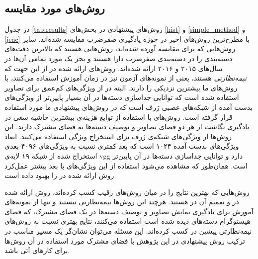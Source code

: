\subsection{روش‌های مورد مقایسه}\label{exp:other_methods}
 در جدول 
  \ref{tab:results}
 روش‌های پیشنهادی در بخش‌های \ref{hist} و  \ref{simple_method} و \ref{jeac}   با مطرح‌ترین روش‌های اخیر در حوزه یادگیری صفرضرب مقایسه شده‌اند.
سایر روش‌هایی که برای مقایسه آورده شده‌اند، روش‌هایی هستند که بالاترین دقت‌های دسته‌بندی را در دسته‌بندی صفرضرب دارا هستند و بجز یک مورد تمامی آن‌ها در سال‌های ۲۰۱۵ و ۲۰۱۶ ارائه شده‌اند.
روش‌های ارائه شده در
\cite{li15max, semi15, Kodirov2015}
از این جهت که \textit{نیمه‌نظارتی} هستند، یعنی از  نمونه‌های آزمون نیز در زمان آموزش استفاده می‌کنند، با روش‌های ما بیشترین نزدیکی را دارند. البته در
\cite{li15max, semi15}
از ویژگی‌های کم‌عمق برای تصاویر استفاده شده است که توانایی جداسازی دسته‌ها در آن بسیار پایین‌تر از ویژگی‌های بدست آمده از شبکه‌های عصبی ژرف است که در روش‌های پیشنهادی ما مورد استفاده قرار گرفته است. روش‌های
\cite{Akata2015, Xian2016}
با استفاده از توابع هزینه‌ی بیشترین حاشیه سعی در یادگیری نگاشت از هر دو فضای تصاویر و توصیف دسته‌ها به فضای مشترک دارند. این روش‌ها از ویژگی‌های شبکه‌ی ژرف
 \cite{googlenet}
 برای استخراج ویژگی استفاده می‌کنند. ابعاد ویژگی‌های بدست آمده ۱۰۲۴ است که بعد کمتری نسبت به ویژگی‌های ۴۰۹۶-بعدی استخراج شده از شبکه ۱۹ لایه‌ی vgg دارد و توانایی جداسازی دسته‌ها در آن پایین‌تر است. همان‌طور که مشاهده می‌شود استفاده از این ویژگی‌های با بعد بیشتر عمل‌کرد روش ارائه شده در \cite{Akata2015} را بهبود داده است.

 روش‌هایی که بهترین نتایج را در میان روش‌های رقیب کسب کرده‌اند، روش ارائه شده در \cite{sse} و تعمیم آن در \cite{agnostic}  هستند. هرچند این روش‌ها نیمه‌نظارتی نیستند و تنها از نمونه‌های آموزش برای یادگیری نمایش تصاویر و توصیف دسته‌ها در یک فضای مشترک، که فضای هیستوگرام دسته‌های دیده شده است استفاده می‌کنند، نتایج بهتری نسبت به روش‌های نیمه‌نظارتی پیشین در \cite{li15max, semi15, Kodirov2015} کسب کرده‌اند. این مسئله می‌توان نشان‌گر یک مسیر مناسب در ترکیب روش پیشنهادی در این پژوهش با فضای مشترک مورد استفاده در آن روش‌ها برای کارهای آتی باشد.

